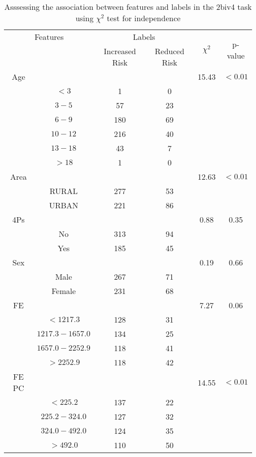 \begin{table}[!htb]
\centering
\caption{Asssessing the association between features and labels in the 2biv4 task using $\chi^2$ test for independence}
\label{tab:chitest_2biv4}
\begin{tabular}{c c | c c| c | c}
\hline
\multicolumn{2}{c|}{Features}& \multicolumn{2}{c|}{Labels}& \multirow{2}{*}{$\chi^2$} & \multirow{2}{*}{p-value}\\ 
& & Increased Risk & Reduced Risk & & \\ 
\hline
Age &  &  & & 15.43 & $< 0.01$ \\ 
& $< 3$ & 1 & 0& & \\ 
& $3-5$ & 57 & 23& & \\ 
& $6-9$ & 180 & 69& & \\ 
& $10-12$ & 216 & 40& & \\ 
& $13-18$ & 43 & 7& & \\ 
& $> 18$ & 1 & 0& & \\ 
\hline 
Area &  &  & & 12.63 & $< 0.01$ \\ 
& RURAL & 277 & 53& & \\ 
& URBAN & 221 & 86& & \\ 
\hline 
4Ps &  &  & & 0.88 & 0.35 \\ 
& No & 313 & 94& & \\ 
& Yes & 185 & 45& & \\ 
\hline 
Sex &  &  & & 0.19 & 0.66 \\ 
& Male & 267 & 71& & \\ 
& Female & 231 & 68& & \\ 
\hline 
FE &  &  & & 7.27 & 0.06 \\ 
& $< 1217.3$ & 128 & 31& & \\ 
& $1217.3-1657.0$ & 134 & 25& & \\ 
& $1657.0-2252.9$ & 118 & 41& & \\ 
& $> 2252.9$ & 118 & 42& & \\ 
\hline 
FE PC &  &  & & 14.55 & $< 0.01$ \\ 
& $< 225.2$ & 137 & 22& & \\ 
& $225.2-324.0$ & 127 & 32& & \\ 
& $324.0-492.0$ & 124 & 35& & \\ 
& $> 492.0$ & 110 & 50& & \\ 
\hline 
\end{tabular}
\end{table}
